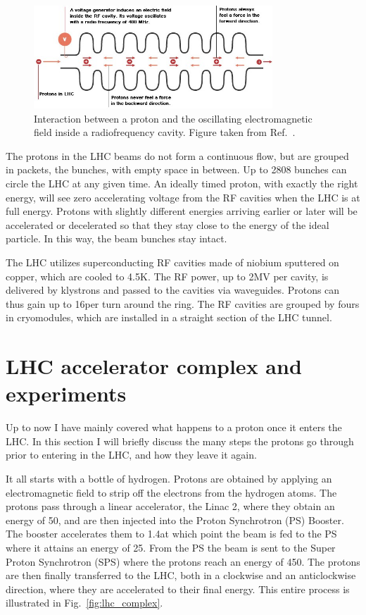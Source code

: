 \begin{figure}[htpb]
  \centering
  \includegraphics[width=0.8\textwidth]{figures/lhc/RF_explanation}
  \caption{Interaction between a proton and the oscillating electromagnetic field inside a
radiofrequency cavity. Figure taken from Ref.~\cite{RF_explanation}.
  \label{fig:RF_explanation}}
\end{figure}

The protons in the LHC beams do not form a continuous flow, but are grouped in packets, the bunches,
with empty space in between. Up to 2808 bunches can circle the LHC at any
given time. An ideally timed proton, with exactly the right energy, will see zero
accelerating voltage from the RF cavities when the LHC is at full energy. Protons with slightly
different energies arriving earlier or later will be accelerated or decelerated so that they stay
close to the energy of the ideal particle. In this way, the beam bunches stay intact. 

The LHC utilizes superconducting RF cavities made of niobium sputtered on copper, which are
cooled to 4.5\unit{K}. The RF power, up to 2\unit{MV} per cavity, is delivered by klystrons and
passed to the cavities via waveguides. Protons can thus gain up to 16\MeV per turn around the ring.
The RF cavities are grouped by fours in cryomodules, which are installed in a straight section of
the LHC tunnel. 

\section{LHC accelerator complex and experiments}

Up to now I have mainly covered what happens to a proton once it enters the LHC. In this section I
will briefly discuss the many steps the protons go through prior to entering in the LHC, and how
they leave it again. 

It all starts with a bottle of hydrogen. Protons are obtained by applying an electromagnetic field
to strip off the electrons from the hydrogen atoms. The protons pass through a linear accelerator,
the Linac 2, where they obtain an energy of 50\MeV, and are then injected into the Proton
Synchrotron (PS) Booster. The booster accelerates them to 1.4\GeV at which point the beam is fed to
the PS where it attains an energy of 25\GeV. From the PS the beam is sent to the Super Proton
Synchrotron (SPS) where the protons reach an energy of 450\GeV. 
The protons are then finally transferred to the LHC, both in a clockwise and an anticlockwise
direction, where they are accelerated to their final energy. This entire process is illustrated in
Fig.~\ref{fig:lhc_complex}. 

